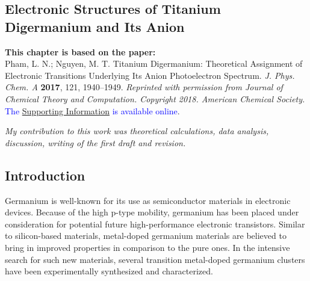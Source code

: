 
\begin{refsection}

\chapter[Titanium Digermanium \ch{T\lowercase{i}G\lowercase{e}2}]{Electronic Structures of Titanium Digermanium and Its Anion} \label{TiGe2}


\begin{shaded}
\textbf{This chapter is based on the paper:}\\
Pham, L. N.; Nguyen, M. T. Titanium Digermanium: Theoretical Assignment of Electronic Transitions Underlying Its Anion Photoelectron Spectrum. \textit{J. Phys. Chem. A} \textbf{2017}, 121, 1940–1949.  \textit{Reprinted with permission from Journal of Chemical Theory and Computation. Copyright 2018. American Chemical Society.} \textcolor{blue}{The \href{https://pubs.acs.org/doi/suppl/10.1021/acs.jpca.7b00245/suppl_file/jp7b00245_si_001.pdf}{Supporting Information} is available online}.

\emph{My contribution to this work was theoretical calculations, data analysis, discussion, writing of the first draft and revision.}
\newpage
\end{shaded}




\section{Introduction}



Germanium is well-known for its use as semiconductor materials in electronic devices. \cite{c4:1, c4:2, c4:3} Because of the high p-type mobility, germanium has been placed under consideration for potential future high-performance electronic transistors. \cite{c4:1} Similar to silicon-based materials, metal-doped germanium materials are believed to bring in improved properties in comparison to the pure ones. \cite{c4:4, c4:5, c4:6, c4:7, c4:8, c4:9, c4:10, c4:11} In the intensive search for such new materials, several transition metal-doped germanium clusters have been experimentally synthesized and characterized. \cite{c4:12, c4:13, c4:14, c4:15, c4:16, c4:17, c4:18, c4:19, c4:20, c4:21} 





\end{refsection}
